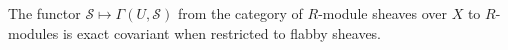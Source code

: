 The functor $\mathcal{S} \mapsto \Gamma(U, \mathcal{S})$ from the category of $R$-module sheaves over $X$ to $R$-modules is exact covariant when restricted to flabby sheaves.
